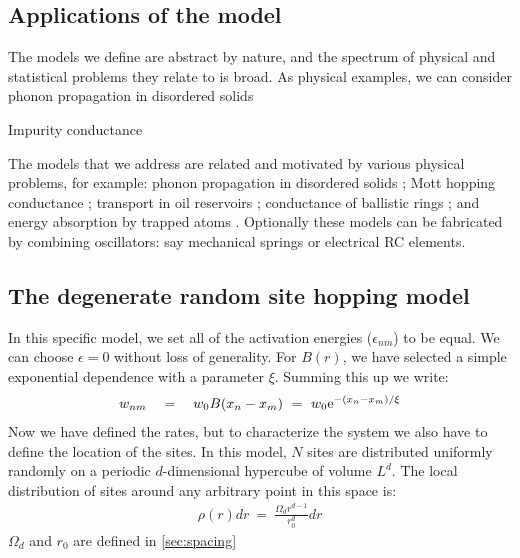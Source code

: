 \subsection{Applications of the model}


The models we define are abstract by nature, and
the spectrum of physical and statistical problems they
relate to is broad. As physical examples, we can consider
phonon propagation in disordered solids 
\cite{nagel_normal-mod_1981,schirmacher_analogies_1992,amir_localization_2010,amir_mean_2008}

Impurity conductance \cite{miller_impurity_1960}

The models that we address are related and motivated  
by various physical problems, for example: 
phonon propagation in disordered solids \cite{phn1,phn2,amir}; 
Mott hopping conductance \cite{mott,miller,AHL,Halp,pollak,VRHbook};
transport in oil reservoirs \cite{aa1,aa2};
conductance of ballistic rings \cite{kbd};
and energy absorption by trapped atoms \cite{kbw}. 
%
Optionally these models can be fabricated by combining oscillators: 
say mechanical springs or electrical RC elements. 


\subsection{The degenerate random site hopping model} \label{sec:degenerate_random_hopping}

In this specific model, we set all of the activation energies ($\epsilon_{nm}$)
to be equal. We can choose $\epsilon=0$ without loss of generality. For $B(r)$, 
we have selected a simple exponential dependence with a parameter $\xi$.
Summing this up we write:
%
\begin{align}\label{eq:random_hopping_rates}
w_{nm} \quad = \quad w_0 B(x_n-x_m) \ = \ w_0 \mbox{e}^{-(x_n-x_m)/\xi}
\end{align}
%
Now we have defined the rates, but to characterize the system we also
have to define the location of the sites. In this model, $N$ sites are distributed
uniformly randomly on a periodic $d$-dimensional hypercube of volume $L^d$. The
local distribution of sites around any arbitrary point in this space is:
%
\begin{align}\label{eq:site_distribution}
\rho(r)dr \ =\ \frac{\Omega_d r^{d-1}}{r_0^d} dr
\end{align}
%
$\Omega_d$ and $r_0$ are defined in \autoref{sec:spacing}

